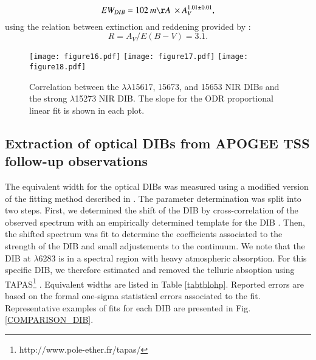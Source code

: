 \documentclass[printer]{aa} %
\begin{document}
\begin{equation}
\label{red}
EW_{DIB}=102 \: m\AA\ \times A_{V}^{1.01  \pm 0.01}
,\end{equation}
using the relation between extinction and reddening provided by \cite{Savage79}:
\begin{equation}
\label{red2}
R= A_{V} / E(B-V)= 3.1
.\end{equation}

\begin{figure}[!htb]
\centering
 \texttt{[image: figure16.pdf]}
 \texttt{[image: figure17.pdf]}
 \texttt{[image: figure18.pdf]}
\caption{\label{correlation} Correlation between the $\lambda\lambda$15617, 15673, and 15653 NIR DIBs and the strong $\lambda$15273  NIR DIB. The slope for the ODR proportional linear fit is shown in each plot.}
\end{figure}


\subsection{Extraction of optical DIBs from APOGEE TSS follow-up observations}
 

The equivalent width for the optical DIBs was measured using a modified version of the fitting method described in \citep{Puspitarini13}. The parameter determination was split into two steps. First, we determined the shift of the DIB by cross-correlation of the observed spectrum with an empirically determined template for the DIB \citep{Puspitarini13,Raimond12}. Then, the shifted spectrum was fit to determine the coefficients associated to the strength of the DIB and small adjustements to the continuum.
We note that the DIB at $\lambda$6283 is in a spectral region with heavy atmospheric absorption. For this specific DIB, we therefore estimated and removed the telluric absoption using TAPAS\footnote{http://www.pole-ether.fr/tapas/} \citep{Bertaux14}.  Equivalent widths are listed in Table \ref{tabtblohp}. Reported errors are based on the formal one-sigma statistical errors associated to the fit. Representative examples of fits for each DIB are presented in Fig. \ref{COMPARISON_DIB}.  
\end{document}
